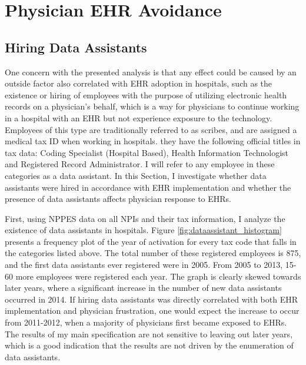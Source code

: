 \documentclass[11pt]{article}
\begin{document}
\section{Physician EHR Avoidance}

\subsection{Hiring Data Assistants}\label{sec:dataass}

One concern with the presented analysis is that any effect could be caused by an outside factor also correlated with EHR adoption in hospitals, such as the existence or hiring of employees with the purpose of utilizing electronic health records on a physician's behalf, which is a way for physicians to continue working in a hospital with an EHR but not experience exposure to the technology. Employees of this type are traditionally referred to as scribes, and are assigned a medical tax ID when working in hospitals. they have the following official titles in tax data: Coding Specialist (Hospital Based), Health Information Technologist and Registered Record Administrator. I will refer to any employee in these categories as a data assistant. In this Section, I investigate whether data assistants were hired in accordance with EHR implementation and whether the presence of data assistants affects physician response to EHRs.  

First, using NPPES data on all NPIs and their tax information, I analyze the existence of data assistants in hospitals. Figure \ref{fig:dataassistant_histogram} presents a frequency plot of the year of activation for every tax code that falls in the categories listed above. The total number of these registered employees is 875, and the first data assistants ever registered were in 2005. From 2005 to 2013, 15-60 more employees were registered each year. The graph is clearly skewed towards later years, where a significant increase in the number of new data assistants occurred in 2014. If hiring data assistants was directly correlated with both EHR implementation and physician frustration, one would expect the increase to occur from 2011-2012, when a majority of physicians first became exposed to EHRs. The results of my main specification are not sensitive to leaving out later years, which is a good indication that the results are not driven by the enumeration of data assistants. 
\end{document}
